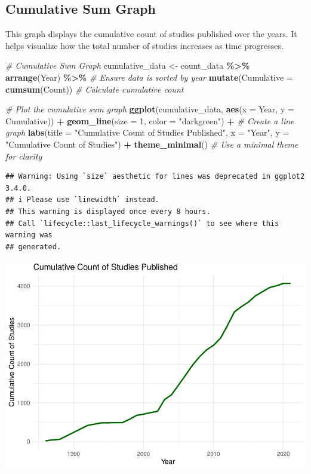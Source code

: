 \documentclass[
]{book}
\newenvironment{Shaded}{\begin{snugshade}}{\end{snugshade}}
\newcommand{\AttributeTok}[1]{\textcolor[rgb]{0.13,0.29,0.53}{#1}}
\newcommand{\CommentTok}[1]{\textcolor[rgb]{0.56,0.35,0.01}{\textit{#1}}}
\newcommand{\DecValTok}[1]{\textcolor[rgb]{0.00,0.00,0.81}{#1}}
\newcommand{\FunctionTok}[1]{\textcolor[rgb]{0.13,0.29,0.53}{\textbf{#1}}}
\newcommand{\NormalTok}[1]{#1}
\newcommand{\OtherTok}[1]{\textcolor[rgb]{0.56,0.35,0.01}{#1}}
\newcommand{\SpecialCharTok}[1]{\textcolor[rgb]{0.81,0.36,0.00}{\textbf{#1}}}
\newcommand{\StringTok}[1]{\textcolor[rgb]{0.31,0.60,0.02}{#1}}
\begin{document}
\subsection{Cumulative Sum Graph}\label{cumulative-sum-graph}

This graph displays the cumulative count of studies published over the years.
It helps visualize how the total number of studies increases as time progresses.

\begin{Shaded}
\begin{Highlighting}[]
\CommentTok{\# Cumulative Sum Graph}
\NormalTok{cumulative\_data }\OtherTok{\textless{}{-}}\NormalTok{ count\_data }\SpecialCharTok{\%\textgreater{}\%}
  \FunctionTok{arrange}\NormalTok{(Year) }\SpecialCharTok{\%\textgreater{}\%}  \CommentTok{\# Ensure data is sorted by year}
  \FunctionTok{mutate}\NormalTok{(}\AttributeTok{Cumulative =} \FunctionTok{cumsum}\NormalTok{(Count))  }\CommentTok{\# Calculate cumulative count}

\CommentTok{\# Plot the cumulative sum graph}
\FunctionTok{ggplot}\NormalTok{(cumulative\_data, }\FunctionTok{aes}\NormalTok{(}\AttributeTok{x =}\NormalTok{ Year, }\AttributeTok{y =}\NormalTok{ Cumulative)) }\SpecialCharTok{+}
  \FunctionTok{geom\_line}\NormalTok{(}\AttributeTok{size =} \DecValTok{1}\NormalTok{, }\AttributeTok{color =} \StringTok{"darkgreen"}\NormalTok{) }\SpecialCharTok{+}  \CommentTok{\# Create a line graph}
  \FunctionTok{labs}\NormalTok{(}\AttributeTok{title =} \StringTok{"Cumulative Count of Studies Published"}\NormalTok{,}
       \AttributeTok{x =} \StringTok{"Year"}\NormalTok{,}
       \AttributeTok{y =} \StringTok{"Cumulative Count of Studies"}\NormalTok{) }\SpecialCharTok{+}
  \FunctionTok{theme\_minimal}\NormalTok{()  }\CommentTok{\# Use a minimal theme for clarity}
\end{Highlighting}
\end{Shaded}

\begin{verbatim}
## Warning: Using `size` aesthetic for lines was deprecated in ggplot2 3.4.0.
## i Please use `linewidth` instead.
## This warning is displayed once every 8 hours.
## Call `lifecycle::last_lifecycle_warnings()` to see where this warning was
## generated.
\end{verbatim}

\includegraphics{_main_files/figure-latex/unnamed-chunk-6-1.pdf}
\end{document}
